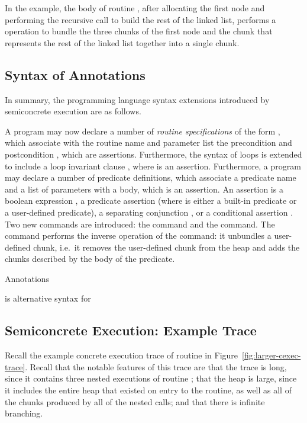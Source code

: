 \documentclass{CSML}
\theoremstyle{definition}\newtheorem{notation}[thm]{Notation}
\theoremstyle{plain}\newtheorem{satz}[thm]{Satz}
\begin{document}
In the example, the body of routine , after 
allocating the first node and performing the recursive call to 
build the rest of the linked list, performs a  
operation to bundle the three chunks of the first node and the 
 chunk that represents the rest of the linked 
list together into a single  chunk.

\subsection{Syntax of Annotations}

In summary, the programming language syntax extensions 
introduced by semiconcrete execution are as follows.

A program may now declare a number of \emph{routine 
specifications}  of the form , which 
associate with the routine name  and parameter list 
 the precondition  and postcondition , 
which are assertions. Furthermore, the syntax of loops is 
extended to include a loop invariant clause , 
where  is an assertion. Furthermore, a program may declare a 
number of predicate definitions, which associate a predicate 
name and a list of parameters with a body, which is an 
assertion. An assertion  is a boolean expression , a 
predicate assertion  (where  is either a 
built-in predicate or a user-defined predicate), a separating 
conjunction , or a conditional assertion . Two new commands are introduced: the 
 command and the  command. The 
 command performs the inverse operation of the 
 command: it unbundles a user-defined chunk, 
i.e.~it removes the user-defined chunk from the heap and adds 
the chunks described by the body of the predicate.

\begin{defi}{Annotations}\label{defi:annotations}



\begin{center}
 is alternative syntax for 
\end{center}

\end{defi}

\subsection{Semiconcrete Execution: Example Trace}

Recall the example concrete execution trace of routine 
 in Figure~\ref{fig:larger-cexec-trace}. 
Recall that the notable features of this trace are that the 
trace is long, since it contains three nested executions of 
routine ; that the heap is large, since it 
includes the entire heap that existed on entry to the routine, 
as well as all of the chunks produced by all of the nested 
calls; and that there is infinite branching. 
\end{document}
